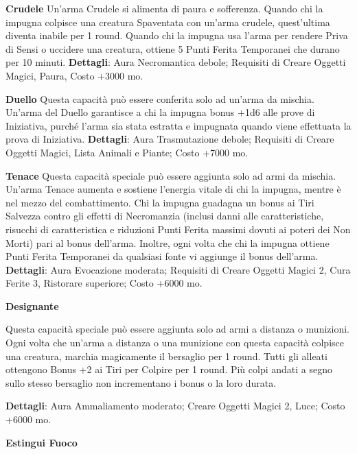 \documentclass[a4paper,twoside,openany]{book}
\begin{document}
\smallskip* \textbf{Crudele}\hypertarget{Crudele}{}
Un'arma Crudele si alimenta di paura e sofferenza. Quando chi la impugna colpisce una creatura Spaventata con un'arma crudele, quest'ultima diventa inabile per 1 round. Quando chi la impugna usa l'arma per rendere Priva di Sensi o uccidere una creatura, ottiene 5 Punti Ferita Temporanei che durano per 10 minuti.
\textbf{Dettagli}: Aura Necromantica debole; Requisiti di Creare Oggetti Magici, Paura, Costo +3000 mo.


\smallskip* \textbf{Duello}\hypertarget{Duello}{}
Questa capacità può essere conferita solo ad un'arma da mischia. Un'arma del Duello garantisce a chi la impugna bonus +1d6 alle prove di Iniziativa, purché l'arma sia stata estratta e impugnata quando viene effettuata la prova di Iniziativa.
\textbf{Dettagli}: Aura Trasmutazione debole; Requisiti di Creare Oggetti Magici, Lista Animali e Piante; Costo +7000 mo.


\smallskip* \textbf{Tenace}\hypertarget{Tenace}{}
Questa capacità speciale può essere aggiunta solo ad armi da mischia. Un'arma Tenace aumenta e sostiene l'energia vitale di chi la impugna, mentre è nel mezzo del combattimento. Chi la impugna guadagna un bonus ai Tiri Salvezza contro gli effetti di Necromanzia (inclusi danni alle caratteristiche, risucchi di caratteristica e riduzioni Punti Ferita massimi dovuti ai poteri dei Non Morti) pari al bonus dell'arma. Inoltre, ogni volta che chi la impugna ottiene Punti Ferita Temporanei da qualsiasi fonte vi aggiunge il bonus dell'arma.
\textbf{Dettagli}: Aura Evocazione moderata; Requisiti di Creare Oggetti Magici 2, Cura Ferite 3, Ristorare superiore; Costo +6000 mo.


\smallskip* \textbf{Designante}\hypertarget{Designante}{}

Questa capacità speciale può essere aggiunta solo ad armi a distanza o munizioni. Ogni volta che un'arma a distanza o una munizione con questa capacità colpisce una creatura, marchia magicamente il bersaglio per 1 round. Tutti gli alleati ottengono Bonus +2 ai Tiri per Colpire per 1 round. Più colpi andati a segno sullo stesso bersaglio non incrementano i bonus o la loro durata.

\textbf{Dettagli}: Aura Ammaliamento moderato; Creare Oggetti Magici 2, Luce; Costo +6000 mo.

\smallskip* \textbf{Estingui Fuoco}\hypertarget{Estingui Fuoco}{}
\end{document}
